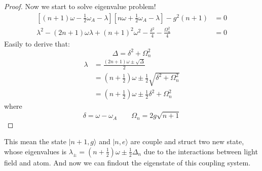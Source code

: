 \documentclass[10pt]{article}
\renewcommand{\ket}[1]{| #1 \rangle}
\begin{document}
        
        \begin{proof}
            Now we start to solve eigenvalue problem!
            \begin{align}
                \left[(n+1)\omega - \frac{1}{2}\omega_A - \lambda\right]\left[n\omega + \frac{1}{2}\omega_A - \lambda\right]-g^2(n+1) &=0 \\
                \lambda^2 - (2n+1)\omega \lambda + (n+1)^2\omega^2 - \frac{\delta^2}{4} - \frac{\Omega^2_n}{4} &= 0 
            \end{align}
            Easily to derive that:
            \begin{equation}
                \Delta = \delta^2 + \Omega^2_n 
            \end{equation}
            \begin{align}
                \lambda &= \frac{(2n+1)\omega \pm \sqrt{\Delta}}{2} \\
                &=(n+\frac{1}{2})\omega \pm\frac{1}{2}\sqrt{\delta^2 + \Omega_n^2} \\
                &= (n+\frac{1}{2})\omega \pm \frac{1}{2} \delta^2 + \Omega^2_n 
            \end{align}
            where
            \begin{equation}
                \delta = \omega - \omega_A \qquad \Omega_n = 2g\sqrt{n+1}
            \end{equation}
        \end{proof}
        This mean the state $\ket{n+1,g}$ and $\ket{n,e}$ are couple and struct two new state, whose eigenvalues is $\lambda_{\pm} = (n+\frac{1}{2})\omega \pm \frac{1}{2} \Delta_n$ due to the interactions between light field and atom.
        And now we can findout the eigenstate of this coupling system.
\end{document}
